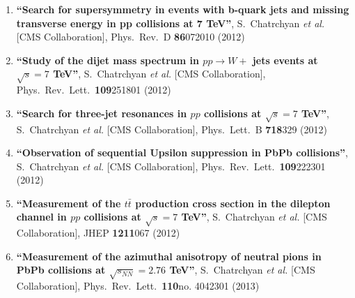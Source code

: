 \begin{enumerate}
\item%
{\bf ``Search for supersymmetry in events with b-quark jets and missing transverse energy in pp collisions at 7 TeV''}, 
  S.~Chatrchyan {\it et al.}  [CMS Collaboration], 
Phys.\ Rev.\ D {\bf 86}072010 (2012) %


\item%
{\bf ``Study of the dijet mass spectrum in $pp \to W +$ jets events at $\sqrt{s}=7$ TeV''}, 
  S.~Chatrchyan {\it et al.}  [CMS Collaboration], 
Phys.\ Rev.\ Lett.\  {\bf 109}251801 (2012) %


\item%
{\bf ``Search for three-jet resonances in $pp$ collisions at $\sqrt{s}=7$ TeV''}, 
  S.~Chatrchyan {\it et al.}  [CMS Collaboration], 
Phys.\ Lett.\ B {\bf 718}329 (2012) %


\item%
{\bf ``Observation of sequential Upsilon suppression in PbPb collisions''}, 
  S.~Chatrchyan {\it et al.}  [CMS Collaboration], 
Phys.\ Rev.\ Lett.\  {\bf 109}222301 (2012) %


\item%
{\bf ``Measurement of the $t\bar{t}$ production cross section in the dilepton channel in $pp$ collisions at $\sqrt{s}=7$ TeV''}, 
  S.~Chatrchyan {\it et al.}  [CMS Collaboration], 
JHEP {\bf 1211}067 (2012) %


\item%
{\bf ``Measurement of the azimuthal anisotropy of neutral pions in PbPb collisions at $\sqrt{s_{NN}}=2.76$ TeV''}, 
  S.~Chatrchyan {\it et al.}  [CMS Collaboration], 
Phys.\ Rev.\ Lett.\  {\bf 110}no. 4042301 (2013) %



\end{enumerate}
